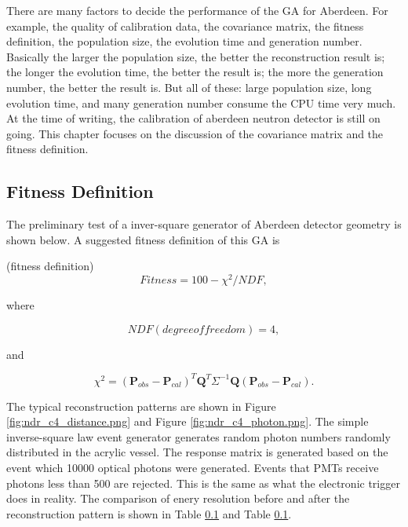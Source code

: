 There are many factors to decide the performance of the GA for Aberdeen.
For example, the quality of calibration data, the covariance matrix, the fitness definition,
the population size, the evolution time and generation number.
Basically the larger the population size, the better the reconstruction result is; the longer the evolution time, the better the result is;
the more the generation number, the better the result is. But all of these: large population size, long evolution time, and many generation
number consume the CPU time very much.
At the time of writing, the calibration of aberdeen neutron detector is still on going.
This chapter focuses on the discussion of the covariance matrix and the fitness definition.














\subsection{Fitness Definition}

The preliminary test of a inver-square generator of Aberdeen
detector geometry is shown below. A suggested fitness definition of this GA is


(fitness definition)
\begin{equation}
\label{fitness}
Fitness = 100 - \chi^{2}/NDF,
\end{equation}


where


\begin{equation}
\label{eq:fitnessNDF}
NDF(degree of freedom) = 4,
\end{equation}


and


\begin{equation}
\label{eq:fitnessChi}
\chi^{2} = (\mathbf{P}_{obs} - \mathbf{P}_{cal})^T\mathbf{Q}^T\Sigma^{-1}\mathbf{Q}(\mathbf{P}_{obs} - \mathbf{P}_{cal}).
\end{equation}


The typical reconstruction patterns are shown in Figure \ref{fig:ndr_c4_distance.png} and Figure \ref{fig:ndr_c4_photon.png}.
The simple inverse-square law event generator generates random photon numbers randomly distributed in the acrylic vessel.
The response matrix is generated based on the event which 10000 optical photons were generated.
Events that PMTs receive photons less than 500 are rejected. This is the same as what the electronic trigger does in reality.
The comparison of enery resolution before and after the reconstruction pattern is shown in Table \ref{} and Table \ref{}.



